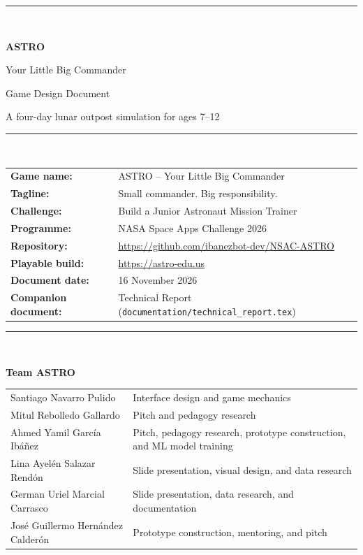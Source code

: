 \documentclass[11pt,a4paper]{article}
\newcommand{\code}[1]{\texttt{#1}}
\begin{document}
\begin{titlepage}
  \centering
  \vspace*{1.2cm}
  {\color{astroblue}\rule{\linewidth}{2pt}}\\[0.8cm]
  {\Huge\bfseries ASTRO\par}
  \vspace{0.3cm}
  {\LARGE Your Little Big Commander\par}
  \vspace{1.0cm}
  {\Large Game Design Document\par}
  \vspace{0.4cm}
  {\large A four-day lunar outpost simulation for ages 7--12\par}
  \vspace{1.2cm}
  {\color{astroblue}\rule{\linewidth}{0.8pt}}\\[1.0cm]

  \begin{tabular}{@{}ll@{}}
    \textbf{Game name:} & ASTRO -- Your Little Big Commander\\
    \textbf{Tagline:} & Small commander. Big responsibility.\\
    \textbf{Challenge:} & Build a Junior Astronaut Mission Trainer\\
    \textbf{Programme:} & NASA Space Apps Challenge 2026\\
    \textbf{Repository:} & \url{https://github.com/ibanezbot-dev/NSAC-ASTRO}\\
    \textbf{Playable build:} & \url{https://astro-edu.us}\\
    \textbf{Document date:} & 16 November 2026\\
    \textbf{Companion document:} & Technical Report (\code{documentation/technical\_report.tex})\\
  \end{tabular}

  \vspace{0.9cm}
  {\color{astroblue}\rule{0.8\linewidth}{0.4pt}}\\[0.4cm]
  {\large\bfseries Team ASTRO\par}
  \vspace{0.3cm}
  {\small
  \begin{tabular}{@{}p{4.8cm}p{9.0cm}@{}}
    Santiago Navarro Pulido & Interface design and game mechanics\\
    Mitul Rebolledo Gallardo & Pitch and pedagogy research\\
    Ahmed Yamil Garc\'ia Ib\'a\~nez & Pitch, pedagogy research, prototype construction, and ML model training\\
    Lina Ayel\'en Salazar Rend\'on & Slide presentation, visual design, and data research\\
    German Uriel Marcial Carrasco & Slide presentation, data research, and documentation\\
    Jos\'e Guillermo Hern\'andez Calder\'on & Prototype construction, mentoring, and pitch\\
  \end{tabular}\par}


\end{titlepage}
\end{document}
